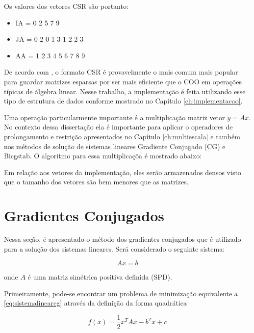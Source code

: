 Os valores dos vetores CSR são portanto:


\begin{center}
    \begin{itemize}
        \item IA = 0 2 5 7 9
        \item JA = 0 2 0 1 3 1 2 2 3
        \item AA = 1 2 3 4 5 6 7 8 9
    \end{itemize}
\end{center}


De acordo com \citet{solverlinear}, o formato CSR é provavelmente o mais comum mais popular para guardar matrizes esparsas por ser mais eficiente que o COO em operações típicas de álgebra linear. Nesse trabalho, a implementação é feita utilizando esse tipo de estrutura de dados conforme mostrado no Capítulo \ref{ch:implementacao}.

Uma operação particularmente importante é a multiplicação matriz vetor $y = Ax$. No contexto dessa dissertação ela é importante para aplicar o operadores de prolongamento  e restrição apresentados no Capítulo \ref{ch:multiescala} e também nos métodos de solução de sistemas lineares Gradiente Conjugado (CG) e Bicgstab. O algoritmo para essa multiplicaçõa é mostrado abaixo:




Em relação aos vetores da implementação, eles serão armazenados densos visto que o tamanho dos vetores são bem menores que as matrizes.


\section{Gradientes Conjugados} \label{sec:cg}

Nessa seção, é apresentado o método dos gradientes conjugados que é utilizado para a solução dos sistemas lineares. Será considerado o seguinte sistema:

\begin{equation} \label{eq:sistemalinearcg}
    Ax = b
\end{equation}

onde $A$ é uma matriz simétrica positiva definida (SPD).


Primeiramente, pode-se encontrar um problema de minimização equivalente a \ref{eq:sistemalinearcg} através da definição da forma quadrática

\begin{equation} \label{eq:quadratica}
    f(x) = \frac{1}{2}  x^T A x - b^T x + c
\end{equation}

